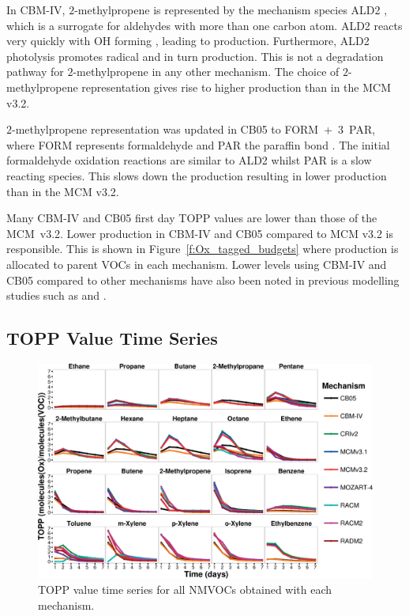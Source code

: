 In CBM-IV, $2$-methylpropene is represented by the mechanism species ALD2 \citep{Hogo:1989}, which is a surrogate for aldehydes with more than one carbon atom. 
ALD2 reacts very quickly with OH forming , leading to  production. 
Furthermore, ALD2 photolysis promotes radical and in turn  production. 
This is not a degradation pathway for $2$-methylpropene in any other mechanism. 
The choice of $2$-methylpropene representation gives rise to higher  production than in the MCM v3.2.

$2$-methylpropene representation was updated in CB05 to \mbox{FORM + $3$ PAR}, where FORM represents formaldehyde and PAR the paraffin  bond \citep{Yarwood:2005}. 
The initial formaldehyde oxidation reactions are similar to ALD2 whilst PAR is a slow reacting species. 
This slows down the  production resulting in lower  production than in the MCM v3.2.

Many CBM-IV and CB05 first day TOPP values are lower than those of the \mbox{MCM v3.2}. 
Lower  production in CBM-IV and CB05 compared to MCM v3.2 is responsible.
This is shown in \mbox{Figure \ref{f:Ox_tagged_budgets}} where  production is allocated to parent VOCs in each mechanism.
Lower  levels using CBM-IV and CB05 compared to other mechanisms have also been noted in previous modelling studies such as \citet{Luecken:2008, Emmerson:2009} and \citet{Saylor:2012}.

\subsection{TOPP Value Time Series} \label{ss:profiles} %

\begin{figure}
    \centering
    \includegraphics[width=\textwidth]{img/TOPP_daily_values_all_species}
    \vspace{0mm}
    \caption{TOPP value time series for all NMVOCs obtained with each mechanism.}
    \vspace{-4mm}
    \label{f:TOPP_dailies}
\end{figure}

